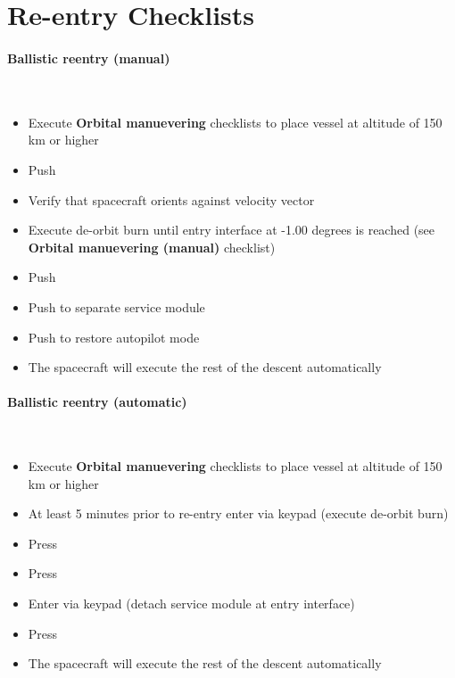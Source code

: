 \section{Re-entry Checklists}
\paragraph{Ballistic reentry (manual)}~
\begin{itemize}
  \item Execute \textbf{Orbital manuevering} checklists to place vessel at altitude of 150 km or higher
  \item Push 
  \item Verify that spacecraft orients against velocity vector
  \item Execute de-orbit burn until entry interface at -1.00 degrees is reached (see \textbf{Orbital manuevering (manual)} checklist)
  \item Push 
  \item Push  to separate service module
  \item Push  to restore autopilot mode
  \item The spacecraft will execute the rest of the descent automatically      
\end{itemize}

\paragraph{Ballistic reentry (automatic)}~
\begin{itemize}
  \item Execute \textbf{Orbital manuevering} checklists to place vessel at altitude of 150 km or higher
  \item At least 5 minutes prior to re-entry enter via keypad  (execute de-orbit burn)
  \item Press 
  \item Press \reg{+}
  \item Enter via keypad  (detach service module at entry interface)
  \item Press 
  \item The spacecraft will execute the rest of the descent automatically      
\end{itemize}


\renewcommand{\labelitemi}{$\bullet$}
